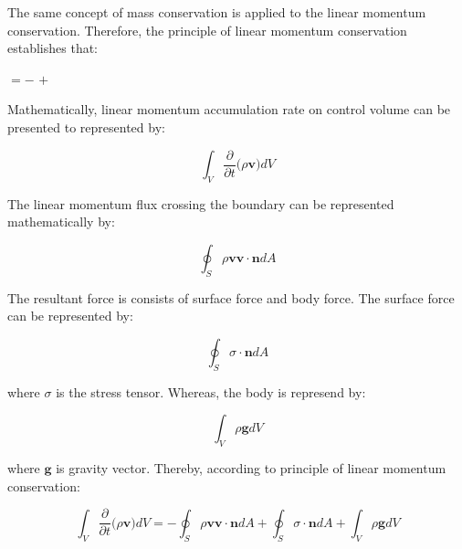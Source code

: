 The same concept of mass conservation is applied to the
linear momentum conservation. Therefore, the principle
of linear momentum conservation establishes that:

\medskip
\begin{center}
           $= -$ 
           $+$ 
\end{center}

\medskip
Mathematically, linear momentum accumulation rate on control volume
can be presented to represented by:

\begin{equation} \label{qml 1} 
 \int_{V} \frac{\partial}{\partial t} \big( \rho \textbf{v} \big) dV
\end{equation}

\medskip
The linear momentum flux crossing the boundary
can be represented mathematically by:

\begin{equation}  
 \oint_{S} \rho \textbf{v} \textbf{v} \cdot \textbf{n} dA
\end{equation}

\medskip
The resultant force is consists of surface force and body force.
The surface force can be represented by:

\begin{equation}  
 \oint_{S} \sigma \cdot \textbf{n} dA
\end{equation}

\medskip
\noindent
where $\sigma$ is the stress tensor. 
Whereas, the body is represend by:

\begin{equation} 
 \int_{V} \rho \textbf{g} dV
\end{equation}

\medskip
\noindent
where $\textbf{g}$ is gravity vector.
Thereby, according to principle of linear momentum conservation:

\begin{equation}
 \int_{V} \frac{\partial}{\partial t} \big( \rho \textbf{v} \big) dV
 = - 
 \oint_{S} \rho \textbf{v} \textbf{v} \cdot \textbf{n} dA
 +
 \oint_{S} \sigma \cdot \textbf{n} dA
 +
 \int_{V} \rho \textbf{g} dV
\end{equation}

